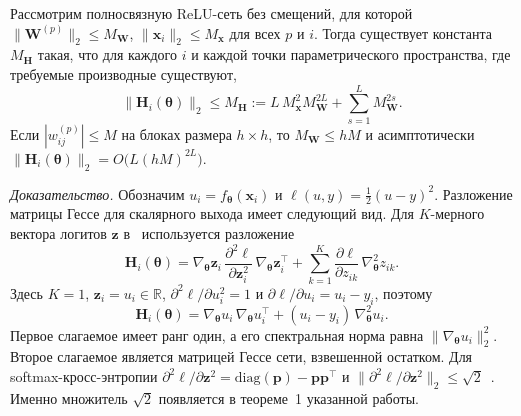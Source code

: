 \begin{lemma}\label{ch1lc:lem:hess-mse}
Рассмотрим полносвязную ReLU-сеть без смещений, для которой
$\|\mathbf{W}^{(p)}\|_2 \le M_{\mathbf{W}}$, $\|\mathbf{x}_i\|_2 \le M_{\mathbf{x}}$ для всех $p$ и $i$.
Тогда существует константа $M_{\mathbf{H}}$ такая, что для каждого $i$ и каждой точки параметрического пространства, где требуемые производные существуют,
\begin{equation}\label{ch1lc:eq:Mh-bound}
  \bigl\| \mathbf{H}_i(\boldsymbol{\theta}) \bigr\|_2 \le M_{\mathbf{H}}
  := L\, M_{\mathbf{x}}^2 M_{\mathbf{W}}^{2L}
  + \sum_{s=1}^{L} M_{\mathbf{W}}^{2s} .
\end{equation}
Если $|w_{ij}^{(p)}|\le M$ на блоках размера $h\times h$, то $M_{\mathbf{W}}\le hM$ и асимптотически
$\|\mathbf{H}_i(\boldsymbol{\theta})\|_2 = O\!\bigl(L(hM)^{2L}\bigr)$.
\end{lemma}
\label{ch1lc:app:proof-lemma-hess}
\noindent\textit{Доказательство.} Обозначим $u_i=f_{\boldsymbol{\theta}}(\mathbf{x}_i)$ и $\ell(u,y)=\tfrac{1}{2}(u-y)^2$. Разложение матрицы Гессе для скалярного выхода имеет следующий вид.
Для $K$-мерного вектора логитов $\mathbf{z}$ в~\cite[раздел~3.4]{grabovoi2024unraveling748584228} используется разложение
\[
  \mathbf{H}_i(\boldsymbol{\theta})
  = \nabla_{\boldsymbol{\theta}}\mathbf{z}_i\,\frac{\partial^2\ell}{\partial\mathbf{z}_i^2}\,\nabla_{\boldsymbol{\theta}}\mathbf{z}_i^{\top}
  + \sum_{k=1}^{K}\frac{\partial\ell}{\partial z_{ik}}\,\nabla_{\boldsymbol{\theta}}^2 z_{ik}.
\]
Здесь $K=1$, $\mathbf{z}_i=u_i\in\mathbb{R}$, $\partial^2\ell/\partial u_i^2=1$ и $\partial\ell/\partial u_i=u_i-y_i$, поэтому
\begin{equation}\label{ch1lc:eq:hess-mse-decomp}
  \mathbf{H}_i(\boldsymbol{\theta})
  = \nabla_{\boldsymbol{\theta}}u_i\,\nabla_{\boldsymbol{\theta}}u_i^{\top}
  + (u_i-y_i)\,\nabla_{\boldsymbol{\theta}}^2 u_i .
\end{equation}
Первое слагаемое имеет ранг один, а его спектральная норма равна $\|\nabla_{\boldsymbol{\theta}}u_i\|_2^2$. Второе слагаемое является матрицей Гессе сети, взвешенной остатком.
Для softmax-кросс-энтропии $\partial^2\ell/\partial\mathbf{z}^2=\mathrm{diag}(\mathbf{p})-\mathbf{p}\mathbf{p}^{\top}$ и $\|\partial^2\ell/\partial\mathbf{z}^2\|_2\le\sqrt{2}$~\cite{grabovoi2024unraveling748584228}. Именно множитель $\sqrt{2}$ появляется в теореме~1 указанной работы.

